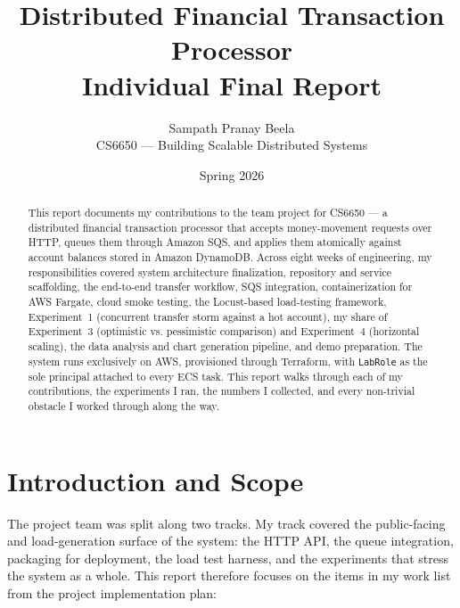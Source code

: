 \documentclass[11pt,a4paper]{article}
\title{%
  \textbf{Distributed Financial Transaction Processor} \\
  \large Individual Final Report
}
\author{Sampath Pranay Beela \\ CS6650 --- Building Scalable Distributed Systems}
\date{Spring 2026}
\begin{document}
\maketitle

\begin{abstract}
\noindent
This report documents my contributions to the team project for CS6650 --- a distributed financial transaction processor that accepts money-movement requests over HTTP, queues them through Amazon SQS, and applies them atomically against account balances stored in Amazon DynamoDB. Across eight weeks of engineering, my responsibilities covered system architecture finalization, repository and service scaffolding, the end-to-end transfer workflow, SQS integration, containerization for AWS Fargate, cloud smoke testing, the Locust-based load-testing framework, Experiment~1 (concurrent transfer storm against a hot account), my share of Experiment~3 (optimistic vs. pessimistic comparison) and Experiment~4 (horizontal scaling), the data analysis and chart generation pipeline, and demo preparation. The system runs exclusively on AWS, provisioned through Terraform, with \texttt{LabRole} as the sole principal attached to every ECS task. This report walks through each of my contributions, the experiments I ran, the numbers I collected, and every non-trivial obstacle I worked through along the way.
\end{abstract}

\tableofcontents
\newpage

\section{Introduction and Scope}

The project team was split along two tracks. My track covered the public-facing and load-generation surface of the system: the HTTP API, the queue integration, packaging for deployment, the load test harness, and the experiments that stress the system as a whole. This report therefore focuses on the items in my work list from the project implementation plan:
\end{document}
